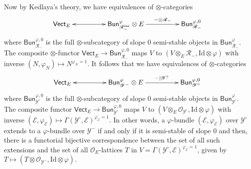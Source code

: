 \documentclass[11pt]{article}
\theoremstyle{definition}
\numberwithin{equation}{section}
\numberwithin{figure}{section}
\numberwithin{table}{section}
\newcommand{\Vect}{\mathsf{Vect}}
\newcommand{\Bun}{\mathsf{Bun}}
\begin{document}
Now by Kedlaya's theory, we have equivalences of $\otimes$-categories
\[
\xymatrix@C=4pc{\Vect_{E} & \Bun_{\mathscr{R}_{-}^{\mathrm{int}}}^{\varphi}\otimes E\ar@{<->}[l]\ar[r]^-{-\otimes\mathscr{R}_{-}} & \Bun_{\mathscr{R}_{-}}^{\varphi,0}}
\]
where $\Bun_{\mathscr{R}_{-}}^{\varphi,0}$ is the full $\otimes$-subcategory of slope $0$ semi-stable objects in $\Bun_{\mathscr{R}_{-}}^{\varphi}$. The composite $\otimes$-functor $\Vect_{E}\rightarrow\Bun_{\mathscr{R}_{-}}^{\varphi,0}$ maps $V$ to $(V\otimes_{E}\mathscr{R}_{-},\mathrm{Id}\otimes\varphi)$ with inverse $(N,\varphi_{N})\mapsto N^{\varphi_{N}=1}$. It follows that we have equivalences of $\otimes$-categories
\[
\xymatrix@C=4pc{\Vect_{E} & \Bun_{\mathscr{Y}^{-}}^{\varphi}\otimes E\ar@{<->}[l]\ar[r]^-{-\vert\mathscr{Y}^{\circ}} & \Bun_{\mathscr{Y}^{\circ}}^{\varphi,0}}
\]
where $\Bun_{\mathscr{Y}^{\circ}}^{\varphi,0}$ is the full $\otimes$-subcategory of slope $0$ semi-stable objects in $\Bun_{\mathscr{Y}^{\circ}}^{\varphi}$. The composite functor $\Vect_{E}\rightarrow\Bun_{\mathscr{Y}^{\circ}}^{\varphi,0}$ maps $V$ to $(V\otimes_{E}\mathscr{O}_{\mathscr{Y}^{\circ}},\mathrm{Id}\otimes\varphi)$ with inverse $(\mathscr{E},\varphi_{\mathscr{E}})\mapsto\Gamma(\mathscr{Y}^{\circ},\mathscr{E})^{\varphi_{\mathscr{E}}=1}$. In other words, a $\varphi$-bundle $(\mathscr{E},\varphi_{\mathscr{E}})$ over $\mathscr{Y}^{\circ}$ extends to a $\varphi$-bundle over $\mathscr{Y}^{-}$ if and only if it is semi-stable of slope $0$ and then, there is a functorial bijective correspondence between the set of all such extensions and the set of all $\mathcal{O}_{E}$-lattices $T$ in $V=\Gamma(\mathscr{Y}^{\circ},\mathscr{E})^{\varphi_{\mathscr{E}}=1}$, given by $T\mapsto\left(T\otimes\mathscr{O}_{\mathscr{Y}^{-}},\mathrm{Id}\otimes\varphi\right)$.

\subsubsection{}\label{subsec:ComputeAnalFunct}
\end{document}
